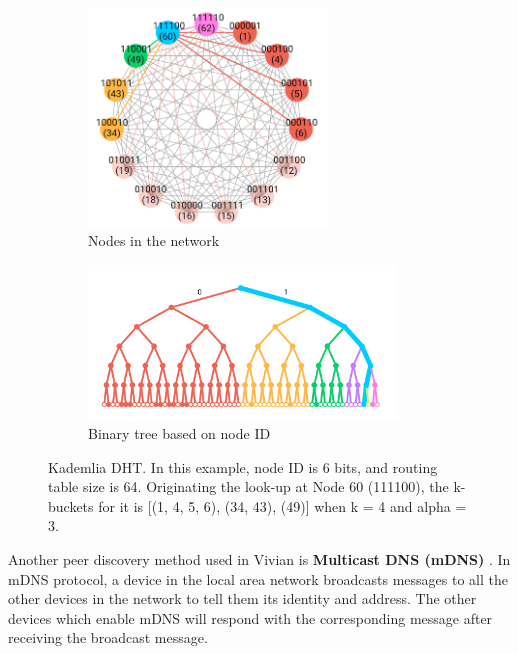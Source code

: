 \begin{figure}[h]
    \centering
    \begin{subfigure}[t]{0.45\textwidth}
        \centering
        \includegraphics[width=0.7\textwidth,trim={0 0 0 0},clip]{figs/kad_k_bucket.png}
        \centering
        \caption{Nodes in the network}
    \end{subfigure}
    \centering
    \begin{subfigure}[b]{0.45\textwidth}
        \centering
        \includegraphics[width=0.9\textwidth,trim={0 0 0 -1.0cm},clip]{figs/kad_binary_tree.png}
        \centering
        \caption{Binary tree based on node ID}
    \end{subfigure}
    \caption{Kademlia DHT. In this example, node ID is 6 bits, and routing table size is 64. Originating the look-up at Node 60 (111100), the k-buckets for it is [(1, 4, 5, 6), (34, 43), (49)] when k = 4 and alpha = 3.}
    \label{fig:kad_dht}
\end{figure}

Another peer discovery method used in Vivian is \textbf{Multicast DNS (mDNS)} \cite{cheshire2013multicast}. In mDNS protocol, a device in the local area network broadcasts messages to all the other devices in the network to tell them its identity and address. The other devices which enable mDNS will respond with the corresponding message after receiving the broadcast message.

